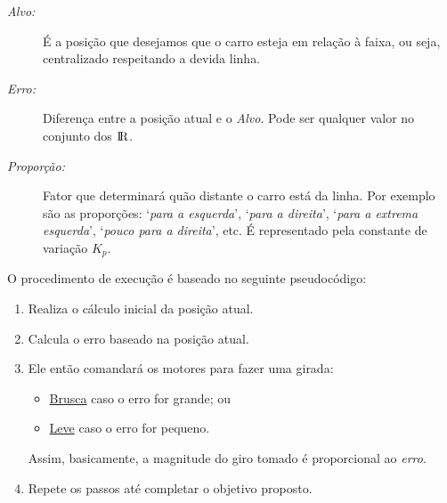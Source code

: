 \documentclass[portugues, brazil, a4paper,12pt]{article}
\begin{document}
		\begin{description}
			\item[\textit{Alvo:}] É a posição que desejamos que o carro esteja em relação à faixa, ou seja, centralizado respeitando a devida linha.

			\item[\textit{Erro:}] Diferença entre a posição atual e o \textit{Alvo}. Pode ser qualquer valor no conjunto dos ${\rm I\!R}$.

			\item[\textit{Proporção:}] Fator que determinará quão distante o carro está da linha. Por exemplo são as proporções: `\textit{para a esquerda}',  `\textit{para a direita}', `\textit{para a extrema esquerda}', `\textit{pouco para a direita}', etc. É representado pela constante de variação $ K_p $.

		\end{description}


		O procedimento de execução é baseado no seguinte pseudocódigo:
		\begin{enumerate} \it
			\item Realiza o cálculo inicial da posição atual.

			\item Calcula o erro baseado na posição atual.

			\item Ele então comandará os motores para fazer uma girada:
			\begin{itemize}
				\item \underline{Brusca} caso o erro for grande; ou
				\item \underline{Leve} caso o erro for pequeno.
			\end{itemize}
			Assim, basicamente, a magnitude do giro tomado é proporcional ao \textit{erro}.

			\item Repete os passos até completar o objetivo proposto.
		\end{enumerate}
\end{document}

